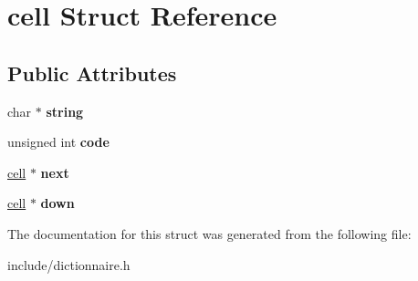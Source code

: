 \hypertarget{structcell}{\section{cell Struct Reference}
\label{structcell}
}
\subsection*{Public Attributes}
\begin{DoxyCompactItemize}
\item 
\hypertarget{structcell_aa12eb57ca093fb9ad177711365721425}{char $\ast$ {\bfseries string}}\label{structcell_aa12eb57ca093fb9ad177711365721425}

\item 
\hypertarget{structcell_a93daba21323027a58d750f1edbe2ef6d}{unsigned int {\bfseries code}}\label{structcell_a93daba21323027a58d750f1edbe2ef6d}

\item 
\hypertarget{structcell_a99a5ca970a81fe153b1007165617e066}{\hyperlink{structcell}{cell} $\ast$ {\bfseries next}}\label{structcell_a99a5ca970a81fe153b1007165617e066}

\item 
\hypertarget{structcell_a211a43f733329a09a8e3caa93f9bde4a}{\hyperlink{structcell}{cell} $\ast$ {\bfseries down}}\label{structcell_a211a43f733329a09a8e3caa93f9bde4a}

\end{DoxyCompactItemize}


The documentation for this struct was generated from the following file\-:\begin{DoxyCompactItemize}
\item 
include/dictionnaire.\-h\end{DoxyCompactItemize}
